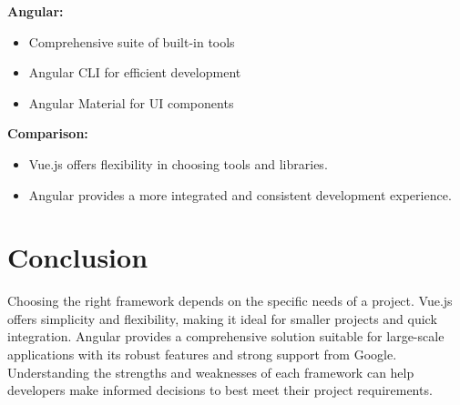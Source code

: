 \textbf{Angular:}
\begin{itemize}
    \item Comprehensive suite of built-in tools
    \item Angular CLI for efficient development
    \item Angular Material for UI components
\end{itemize}

\textbf{Comparison:}
\begin{itemize}
    \item Vue.js offers flexibility in choosing tools and libraries.
    \item Angular provides a more integrated and consistent development experience.
\end{itemize}

\section{Conclusion}

Choosing the right framework depends on the specific needs of a project. Vue.js offers simplicity and flexibility, making it ideal for smaller projects and quick integration. Angular provides a comprehensive solution suitable for large-scale applications with its robust features and strong support from Google. Understanding the strengths and weaknesses of each framework can help developers make informed decisions to best meet their project requirements.